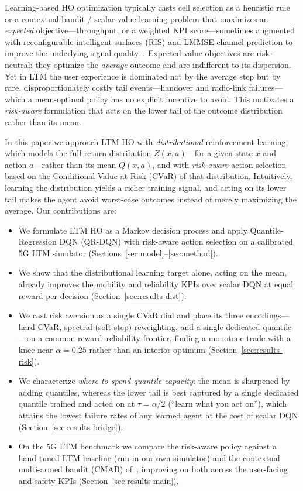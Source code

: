 \documentclass[conference]{IEEEtran}
\begin{document}
Learning-based HO optimization typically casts cell selection as a heuristic rule or a contextual-bandit / scalar value-learning problem that maximizes an \emph{expected} objective---throughput, or a weighted KPI score---sometimes augmented with reconfigurable intelligent surfaces (RIS) and LMMSE channel prediction to improve the underlying signal quality~\cite{cmab_ho}.
Expected-value objectives are risk-neutral: they optimize the \emph{average} outcome and are indifferent to its dispersion.
Yet in LTM the user experience is dominated not by the average step but by rare, disproportionately costly tail events---handover and radio-link failures---which a mean-optimal policy has no explicit incentive to avoid.
This motivates a \emph{risk-aware} formulation that acts on the lower tail of the outcome distribution rather than its mean.

In this paper we approach LTM HO with \emph{distributional} reinforcement learning, which models the full return distribution $Z(x,a)$---for a given state $x$ and action $a$---rather than its mean $Q(x,a)$, and with \emph{risk-aware} action selection based on the Conditional Value at Risk (CVaR) of that distribution.
Intuitively, learning the distribution yields a richer training signal, and acting on its lower tail makes the agent avoid worst-case outcomes instead of merely maximizing the average.
Our contributions are:

\begin{itemize}
  \item We formulate LTM HO as a Markov decision process and apply
  Quantile-Regression DQN (QR-DQN) with risk-aware action selection on a
  calibrated 5G LTM simulator (Sections~\ref{sec:model}--\ref{sec:method}).
  \item We show that the distributional learning target alone, acting on the mean,
  already improves the mobility and reliability KPIs over scalar DQN at equal
  reward per decision (Section~\ref{sec:results-dist}).
  \item We cast risk aversion as a single CVaR dial and place its three
  encodings---hard CVaR, spectral (soft-step) reweighting, and a single dedicated
  quantile---on a common reward--reliability frontier, finding a monotone trade
  with a knee near $\alpha=0.25$ rather than an interior optimum
  (Section~\ref{sec:results-risk}).
  \item We characterize \emph{where to spend quantile capacity}: the mean is
  sharpened by adding quantiles, whereas the lower tail is best captured by a
  single dedicated quantile trained and acted on at $\tau=\alpha/2$ (``learn what
  you act on''), which attains the lowest failure rates of any learned agent at the
  cost of scalar DQN (Section~\ref{sec:results-bridge}).
  \item On the 5G LTM benchmark we compare the risk-aware policy against a
  hand-tuned LTM baseline (run in our own simulator) and the contextual
  multi-armed bandit (CMAB) of~\cite{cmab_ho}, improving on both across the
  user-facing and safety KPIs (Section~\ref{sec:results-main}).
\end{itemize}
\end{document}
